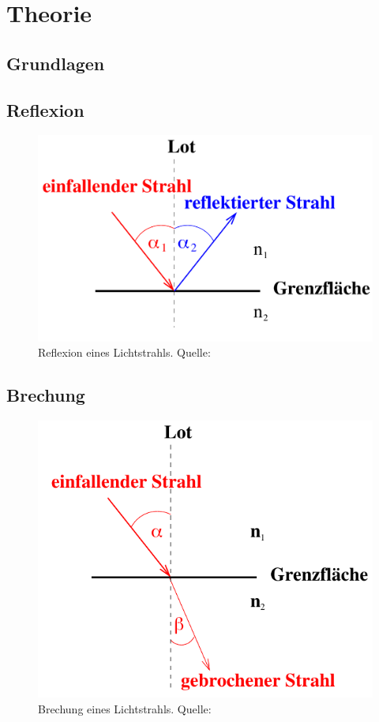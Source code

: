 \section{Theorie}
\label{sec:Theorie}

\subsection{Grundlagen}
\label{sec:grundlagen}

\subsection{Reflexion}
\label{sec:reflexion}
\begin{figure}[H]
    \centering
    \includegraphics[scale = 0.3]{pictures/Reflexion.png}
    \caption{Reflexion eines Lichtstrahls. Quelle: \cite{AP01}}
    \label{fig:reflexion}
\end{figure}

\subsection{Brechung}
\label{sec:brechung}
\begin{figure}[H]
    \centering
    \includegraphics[scale = 0.5]{pictures/Brechung.png}
    \caption{Brechung eines Lichtstrahls. Quelle: \cite{AP01}}
    \label{fig:brechung}
\end{figure}

